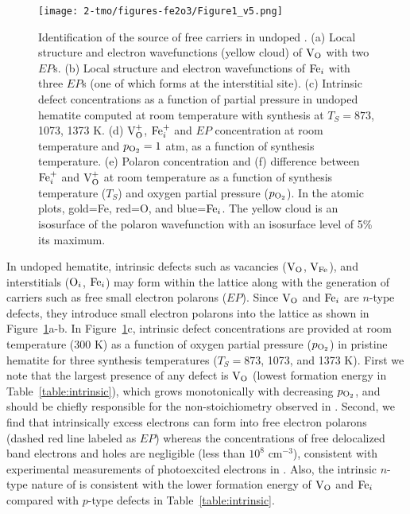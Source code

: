 \begin{figure}[H]
\centering
\texttt{[image: 2-tmo/figures-fe2o3/Figure1\_v5.png]}
\caption{Identification of the source of free carriers in undoped .
(a) Local structure and electron wavefunctions (yellow cloud) of $\text{V}_\text{O}$ with two $EP$s.
(b) Local structure and electron wavefunctions of $\text{Fe}_i$ with three $EP$s (one of which forms at the interstitial site).
(c) Intrinsic defect concentrations as a function of  partial pressure in undoped hematite computed at room temperature with synthesis at $T_S = 873$, 1073, 1373 K.
(d) $\text{V}_\text{O}^+$, $\text{Fe}_i^+$ and $EP$ concentration at room temperature and $p_{\rm O_2}=1$ atm, as a function of synthesis temperature.
(e) Polaron concentration and (f) difference between $\text{Fe}_i^+$ and $\text{V}_\text{O}^+$ at room temperature as a function of synthesis temperature ($T_S$) and oxygen partial pressure ($p_{\rm O_2}$).
In the atomic plots, gold=Fe, red=O, and blue=$\text{Fe}_i$.
The yellow cloud is an isosurface of the polaron wavefunction with an isosurface level of 5\% its maximum.
}
\label{fig:intrinsic}
\end{figure}

In undoped hematite, intrinsic defects such as vacancies ($\text{V}_\text{O}$, $\text{V}_\text{Fe}$), and interstitials ($\text{O}_i$, $\text{Fe}_i$) may form within the lattice along with the generation of carriers such as free small electron polarons ($EP$).
Since $\text{V}_\text{O}$ and $\text{Fe}_i$ are $n$-type defects, they introduce small electron polarons into the lattice as shown in Figure~\ref{fig:intrinsic}a-b.
In Figure~\ref{fig:intrinsic}c, intrinsic defect concentrations are provided at room temperature (300 K) as a function of oxygen partial pressure ($p_{\rm O_2}$) in pristine hematite for three synthesis temperatures ($T_S = 873$, 1073, and 1373 K).
First we note that the largest presence of any defect is $\text{V}_\text{O}$ (lowest formation energy in Table~\ref{table:intrinsic}), which grows monotonically with decreasing $p_{\rm O_2}$, and should be chiefly responsible for the non-stoichiometry observed in . \cite{dieckmann1993point}
Second, we find that intrinsically excess electrons can form into free electron polarons (dashed red line labeled as $EP$) whereas the concentrations of free delocalized band electrons and holes are negligible (less than $10^8$ cm$^{-3}$), consistent with experimental measurements of photoexcited electrons in .\cite{carneiro2017excitation} Also, the intrinsic $n$-type nature of  is consistent with the lower formation energy of $\text{V}_\text{O}$ and $\text{Fe}_i$ compared with $p$-type defects in Table~\ref{table:intrinsic}.


